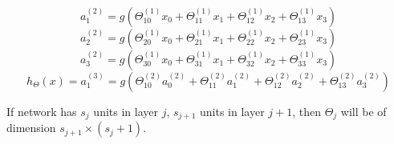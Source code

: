 \documentclass{article}
\begin{document}
\bigskip

\[a_1^{(2)} = g(\Theta_{10}^{(1)} x_0 + \Theta_{11}^{(1)} x_1 + \Theta_{12}^{(1)} x_2 + \Theta_{13}^{(1)} x_3)\]
\[a_2^{(2)} = g(\Theta_{20}^{(1)} x_0 + \Theta_{21}^{(1)} x_1 + \Theta_{22}^{(1)} x_2 + \Theta_{23}^{(1)} x_3)\]
\[a_3^{(2)} = g(\Theta_{30}^{(1)} x_0 + \Theta_{31}^{(1)} x_1 + \Theta_{32}^{(1)} x_2 + \Theta_{33}^{(1)} x_3)\]
\[h_{\Theta}(x) = a_1^{(3)} = g(\Theta_{10}^{(2)} a_0^{(2)} + \Theta_{11}^{(2)} a_1^{(2)} + \Theta_{12}^{(2)} a_2^{(2)} + \Theta_{13}^{(2)} a_3^{(2)})\]

\bigskip

\noindent If network has \(s_j\) units in layer \(j\), \(s_{j + 1}\) units in layer \(j + 1\), then \(\Theta_j\) will be of dimension \(s_{j + 1} \times (s_j + 1)\).

\printindex
\end{document}

